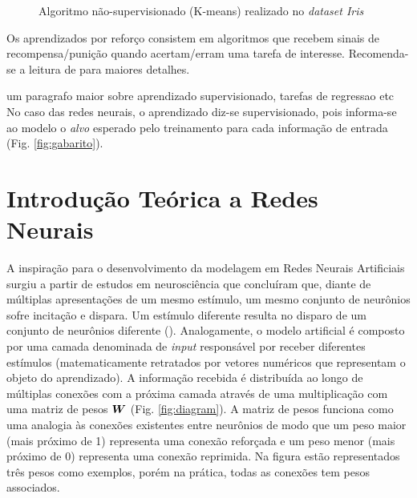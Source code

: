 \begin{figure}[!htb]
    \caption{\label{fig:iris} Algoritmo não-supervisionado (K-means) realizado no \textit{dataset Iris} }
  \end{figure}

Os aprendizados por reforço consistem em algoritmos que recebem sinais de recompensa/punição quando acertam/erram uma tarefa de interesse. Recomenda-se a leitura de \cite{KLMSurvey:1996} para maiores detalhes.

um paragrafo maior sobre aprendizado supervisionado, tarefas de regressao etc
No caso das redes neurais, o aprendizado diz-se supervisionado, pois informa-se ao modelo o \textit{alvo} esperado  pelo treinamento para cada informação de entrada (Fig. \ref{fig:gabarito}). 

\section{Introdução Teórica a Redes Neurais}
\label{sec:intro-rn}
A inspiração para o desenvolvimento da modelagem em Redes Neurais Artificiais surgiu a partir de estudos em neurosciência que concluíram que, diante de múltiplas apresentações de um mesmo estímulo, um mesmo conjunto de neurônios sofre incitação e dispara. Um estímulo diferente resulta no disparo de um conjunto de neurônios diferente (\cite{hubel:1962}).  Analogamente, o modelo artificial é composto por uma camada denominada de \textit{input} responsável por receber diferentes estímulos (matematicamente retratados por vetores numéricos que representam o objeto do aprendizado). A informação recebida é distribuída ao longo de múltiplas conexões com a próxima camada através de uma multiplicação com uma matriz de pesos $\bm{W}$ (Fig. \ref{fig:diagram}). A matriz de pesos funciona como uma analogia às conexões existentes entre neurônios de modo que um peso maior (mais próximo de 1) representa uma conexão reforçada e um peso menor (mais próximo de 0) representa uma conexão reprimida. Na figura estão representados três pesos como exemplos, porém na prática, todas as conexões tem pesos associados.

